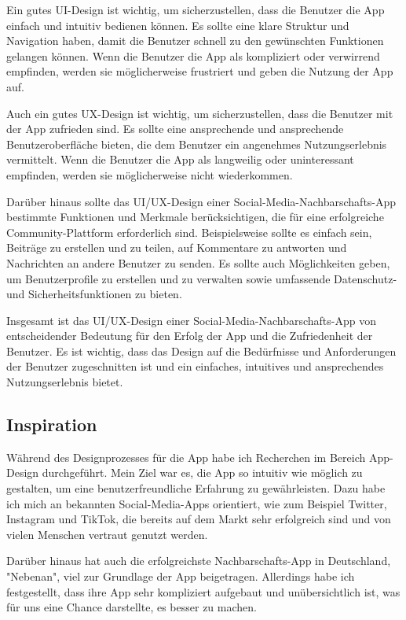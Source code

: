 Ein gutes UI-Design ist wichtig, um sicherzustellen, dass die Benutzer die App einfach und intuitiv bedienen können. Es sollte eine klare Struktur und Navigation haben, damit die Benutzer schnell zu den gewünschten Funktionen gelangen können. Wenn die Benutzer die App als kompliziert oder verwirrend empfinden, werden sie möglicherweise frustriert und geben die Nutzung der App auf.

Auch ein gutes UX-Design ist wichtig, um sicherzustellen, dass die Benutzer mit der App zufrieden sind. Es sollte eine ansprechende und ansprechende Benutzeroberfläche bieten, die dem Benutzer ein angenehmes Nutzungserlebnis vermittelt. Wenn die Benutzer die App als langweilig oder uninteressant empfinden, werden sie möglicherweise nicht wiederkommen.

Darüber hinaus sollte das UI/UX-Design einer Social-Media-Nachbarschafts-App bestimmte Funktionen und Merkmale berücksichtigen, die für eine erfolgreiche Community-Plattform erforderlich sind. Beispielsweise sollte es einfach sein, Beiträge zu erstellen und zu teilen, auf Kommentare zu antworten und Nachrichten an andere Benutzer zu senden. Es sollte auch Möglichkeiten geben, um Benutzerprofile zu erstellen und zu verwalten sowie umfassende Datenschutz- und Sicherheitsfunktionen zu bieten.

Insgesamt ist das UI/UX-Design einer Social-Media-Nachbarschafts-App von entscheidender Bedeutung für den Erfolg der App und die Zufriedenheit der Benutzer. Es ist wichtig, dass das Design auf die Bedürfnisse und Anforderungen der Benutzer zugeschnitten ist und ein einfaches, intuitives und ansprechendes Nutzungserlebnis bietet.
\author{Martin Hausleitner}
\subsection{Inspiration}
Während des Designprozesses für die App habe ich Recherchen im Bereich App-Design durchgeführt. Mein Ziel war es, die App so intuitiv wie möglich zu gestalten, um eine benutzerfreundliche Erfahrung zu gewährleisten. Dazu habe ich mich an bekannten Social-Media-Apps orientiert, wie zum Beispiel Twitter, Instagram und TikTok, die bereits auf dem Markt sehr erfolgreich sind und von vielen Menschen vertraut genutzt werden.

Darüber hinaus hat auch die erfolgreichste Nachbarschafts-App in Deutschland, "Nebenan", viel zur Grundlage der App beigetragen. Allerdings habe ich festgestellt, dass ihre App sehr kompliziert aufgebaut und unübersichtlich ist, was für uns eine Chance darstellte, es besser zu machen.

